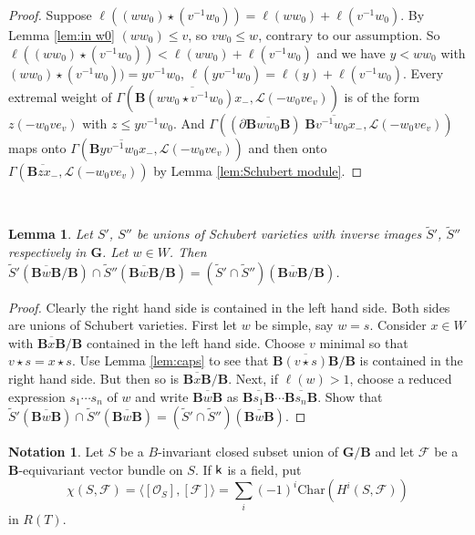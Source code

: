 \documentclass[sn-mathphys-num]{sn-jnl}%
\newcommand\F{{\mathcal F}}
\newcommand{\Oo}{\mathcal O}
\newcommand{\Ll}{\mathcal L}
\newcommand{\Char}{{\mathrm{Char}}}
\newcommand{\sk}{{\sf k}}
\newcommand{\bg}{\mathbf G}
\newcommand{\fb}{\mathbf B}
\newtheorem{lemma}[theorem]{Lemma}
\theoremstyle{definition}
\newtheorem{notation}[theorem]{Notation}
\begin{document}
 \begin{proof}
 Suppose 
$\ell((ww_0)\star (v^{-1}w_0))=\ell(ww_0)+\ell(v^{-1}w_0)$. By Lemma \ref{lem:in w0}
 $(ww_0)\leq v$, so $vw_0\leq w$, contrary to our assumption.
So $\ell((ww_0)\star (v^{-1}w_0))<\ell(ww_0)+\ell(v^{-1}w_0)$ and we have $y<ww_0$ with 
$(ww_0)\star (v^{-1}w_0))=yv^{-1}w_0 $, $\ell(yv^{-1}w_0)=\ell(y)+\ell(v^{-1}w_0)$. Every extremal weight of $\Gamma(\overline{{\fb}(ww_0\star v^{-1}w_0)x_-},\Ll(-w_0ve_v))$
is of the form $z(-w_0ve_v)$ with $z\leq yv^{-1}w_0$.
And $\Gamma((\partial \overline{{\fb}ww_0{\fb}})\;\overline{{\fb}v^{-1}w_0x_-},\Ll(-w_0ve_v))$ maps onto 
$\Gamma( \overline{{\fb}yv^{-1}w_0x_-},\Ll(-w_0ve_v))$ and then onto
$\Gamma( \overline{{\fb}zx_-},\Ll(-w_0ve_v))$ by Lemma \ref{lem:Schubert module}.
 \end{proof}
  


\

\begin{lemma}\label{lem:capw}
Let $S'$, $S''$ be unions of Schubert varieties with inverse images $\tilde S'$, $\tilde S''$ respectively in $\bg$. Let $w\in W$. 
Then $\tilde S'(\overline{{\fb}w{\fb}}/{\fb})\cap \tilde S''(\overline{{\fb}w{\fb}}/{\fb})=(\tilde S'\cap\tilde S'')(\overline{{\fb}w{\fb}}/{\fb})$.
\end{lemma}
\begin{proof}Clearly the right hand side is contained in the left hand side.
Both sides are unions of Schubert varieties.
First let $w$ be simple,
say $w=s$. Consider $x\in W$ with $\overline{{\fb}x{\fb}}/{\fb}$ contained in the left hand side. Choose $v$ minimal so that $v\star s= x\star s$.
Use Lemma \ref{lem:caps} to see that $\overline{{\fb}(v\star s){\fb}}/{\fb}$ is contained in the right hand side. But then so is $\overline{{\fb}x{\fb}}/{\fb}$. Next, if $\ell(w)>1$, choose a reduced expression $s_1\cdots s_n$ of $w$ and write $\overline{{\fb}w{\fb}}$ as $\overline{{\fb}s_1{\fb}}\cdots  \overline{{\fb}s_n{\fb}}$. Show that $\tilde S'(\overline{{\fb}w{\fb}})\cap \tilde S''(\overline{{\fb}w{\fb}})=(\tilde S'\cap\tilde S'')(\overline{{\fb}w{\fb}})$.
\end{proof}
 \begin{notation}
Let $S$ be a $B$-invariant closed subset union of  $ \bg /{\fb}$ and let $\F$ be a $\fb$-equivariant vector bundle on $S$. If $\sk$ is a field, put
$$\chi(S,\F)=\langle[\Oo_S],[\F]\rangle=\sum_i(-1)^i\Char(H^i(S,\F))$$
 in $R(T)$.
\end{notation}  
\end{document}
